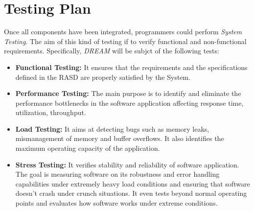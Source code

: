 \section{Testing Plan}

Once all components have been integrated, programmers could perform \textit{System Testing}.
The aim of this kind of testing if to verify functional and non-functional requirements.
Specifically, \textit{DREAM} will be subjct of the following tests:

\begin{itemize}
    \item \textbf{Functional Testing:} It ensures that the requirements and the specifications defined in the RASD are properly satisfied by the System. 
    \item \textbf{Performance Testing:} The main purpose is to identify and eliminate the performance bottlenecks in the software application affecting response time, utilization, throughput.
    \item \textbf{Load Testing:} It aims at detecting bugs such as memory leaks, mismanagement of memory and buffer overflows. It also identifies the maximum operating capacity of the application.
    \item \textbf{Stress Testing:} It verifies stability and reliability of software application. The goal is measuring software on its robustness and error handling capabilities under extremely heavy load conditions and ensuring that software doesn't crash under crunch situations. It even tests beyond normal operating points and evaluates how software works under extreme conditions.
\end{itemize}